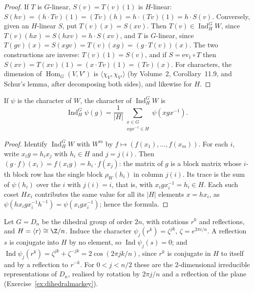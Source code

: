 \begin{proof}
If $T$ is $G$-linear, $S(v)=T(v)(1)$ is $H$-linear: $S(hv)=(h\cdot Tv)(1)=(Tv)(h)=h\cdot(Tv)(1)=h\cdot S(v)$. Conversely, given an $H$-linear $S$, put $T(v)(x)=S(xv)$. Then $T(v)\in\operatorname{Ind}_H^GW$, since
$T(v)(hx)=S(hxv)=h\cdot S(xv)$, and $T$ is $G$-linear, since $T(gv)(x)=S(xgv)=T(v)(xg)=(g\cdot T(v))(x)$. The two constructions are inverse: $T(v)(1)=S(v)$, and if $S=\mathrm{ev}_1\circ T$ then
$S(xv)=T(xv)(1)=(x\cdot Tv)(1)=(Tv)(x)$. For characters, the dimension of $\operatorname{Hom}_G(V,V')$ is $\langle\chi_V,\chi_{V'}\rangle$ (by Volume~2, Corollary~11.9, and Schur's lemma, after decomposing both sides), and likewise
for $H$.
\end{proof}

\begin{proposition}\label{prop:indchar}
If $\psi$ is the character of $W$, the character of $\operatorname{Ind}_H^GW$ is
\[
\operatorname{Ind}_H^G\psi(g)=\frac1{|H|}\sum_{\substack{x\in G\\ xgx^{-1}\in H}}\psi(xgx^{-1}).
\]
\end{proposition}

\begin{proof}
Identify $\operatorname{Ind}_H^GW$ with $W^m$ by $f\mapsto(f(x_1),\dots,f(x_m))$. For each $i$, write $x_ig=h_ix_{j}$ with $h_i\in H$ and $j=j(i)$. Then $(g\cdot f)(x_i)=f(x_ig)=h_i\cdot f(x_j)$: the matrix of $g$ is a block matrix whose
$i$-th block row has the single block $\rho_W(h_i)$ in column $j(i)$. Its trace is the sum of $\psi(h_i)$ over the $i$ with $j(i)=i$, that is, with $x_igx_i^{-1}=h_i\in H$. Each such coset $Hx_i$ contributes the same value for all
its $|H|$ elements $x=hx_i$, as $\psi(hx_igx_i^{-1}h^{-1})=\psi(x_igx_i^{-1})$; hence the formula.
\end{proof}

\begin{example}\label{ex:dihedral}
Let $G=D_n$ be the dihedral group of order $2n$, with rotations $r^k$ and reflections, and $H=\langle r\rangle\cong\Z/n$. Induce the character $\psi_j(r^k)=\zeta^{jk}$, $\zeta=e^{2\pi i/n}$. A reflection $s$ is conjugate into $H$ by no
element, so $\operatorname{Ind}\psi_j(s)=0$; and $\operatorname{Ind}\psi_j(r^k)=\zeta^{jk}+\zeta^{-jk}=2\cos(2\pi jk/n)$, since $r^k$ is conjugate in $H$ to itself and by a reflection to $r^{-k}$. For $0<j<n/2$ these are the
$2$-dimensional irreducible representations of $D_n$, realised by rotation by $2\pi j/n$ and a reflection of the plane (Exercise~\ref{ex:dihedralmackey}).
\end{example}

